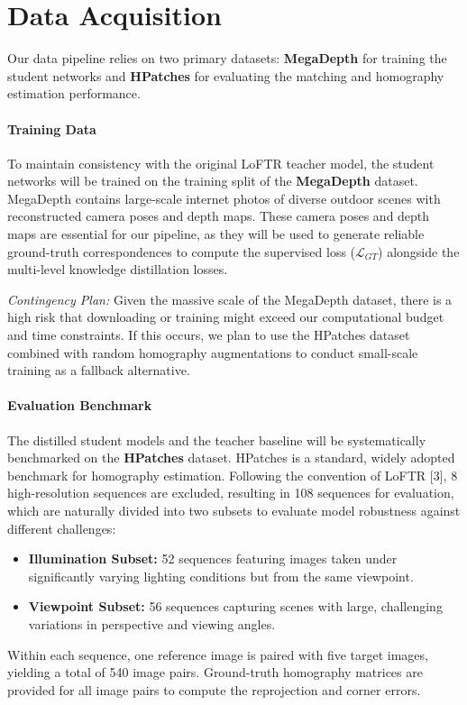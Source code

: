 \documentclass{article}
\begin{document}
	
\section{Data Acquisition}
Our data pipeline relies on two primary datasets: \textbf{MegaDepth} for training the student networks and \textbf{HPatches} for evaluating the matching and homography estimation performance.

\paragraph{Training Data}
To maintain consistency with the original LoFTR teacher model, the student networks will be trained on the training split of the \textbf{MegaDepth} dataset. MegaDepth contains large-scale internet photos of diverse outdoor scenes with reconstructed camera poses and depth maps. These camera poses and depth maps are essential for our pipeline, as they will be used to generate reliable ground-truth correspondences to compute the supervised loss ($\mathcal{L}_{GT}$) alongside the multi-level knowledge distillation losses.

\textit{Contingency Plan:} Given the massive scale of the MegaDepth dataset, there is a high risk that downloading or training might exceed our computational budget and time constraints. If this occurs, we plan to use the HPatches dataset combined with random homography augmentations to conduct small-scale training as a fallback alternative.

\paragraph{Evaluation Benchmark}
The distilled student models and the teacher baseline will be systematically benchmarked on the \textbf{HPatches} dataset. HPatches is a standard, widely adopted benchmark for homography estimation. Following the convention of LoFTR [3], 8 high-resolution sequences are excluded, resulting in 108 sequences for evaluation, which are naturally divided into two subsets to evaluate model robustness against different challenges:
\begin{itemize}
    \item \textbf{Illumination Subset:} 52 sequences featuring images taken under significantly varying lighting conditions but from the same viewpoint.
    \item \textbf{Viewpoint Subset:} 56 sequences capturing scenes with large, challenging variations in perspective and viewing angles.
\end{itemize}
Within each sequence, one reference image is paired with five target images, yielding a total of 540 image pairs. Ground-truth homography matrices are provided for all image pairs to compute the reprojection and corner errors.
\end{document}
